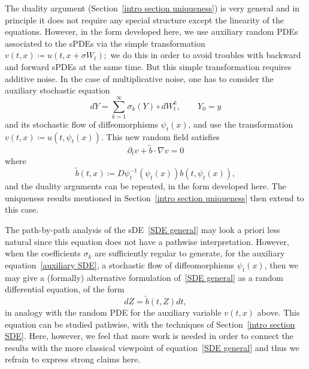 \documentclass[a4paper,10pt]{article}
\newcommand\1{\mathbbm{1}}
\newcommand{\td}{\tilde}
\numberwithin{equation}{section}
\begin{document}
The duality argument (Section~\ref{intro section uniqueness}) is very general and in principle it does not require any special structure except the linearity of the equations. However, in the form developed here, we use auxiliary random PDEs associated to the sPDEs via the simple transformation $v( t,x) \coloneqq u( t,x+\sigma W_{t}) $;\ we do this in order to avoid troubles with backward and forward sPDEs at the same time. But this simple transformation requires additive noise. In the case of multiplicative noise, one has to consider the auxiliary stochastic equation 
\begin{equation}
dY = \sum_{k=1}^{\infty }\sigma _{k}( Y) \circ dW_{t}^{k},\qquad Y_{0}=y  \label{auxiliary SDE}
\end{equation} 
and its stochastic flow of diffeomorphisms $\psi_{t}( x) $, and use the transformation $v(t,x) \coloneqq u(t,\psi_{t}(x))$. This new random field satisfies 
\begin{equation*}
\partial_t v +\widetilde{b}\cdot \nabla v=0
\end{equation*} 
where
\begin{equation*}
\td{b}(t,x)\coloneqq D\psi^{-1}_t(\psi_t(x))b(t,\psi_t(x)),
\end{equation*}
and the duality arguments can be repeated, in the form developed here. The uniqueness results mentioned in Section~\ref{intro section uniqueness} then extend to this case.

The path-by-path analysis of the sDE~\eqref{SDE general} may look a priori less natural since this equation does not have a pathwise interpretation. However, when the coefficients $\sigma _{k}$ are sufficiently regular to generate, for the auxiliary equation~\eqref{auxiliary SDE}, a stochastic flow of diffeomorphisms $\psi _{t}( x) $, then we may give a (formally) alternative formulation of~\eqref{SDE general} as a random differential equation, of the form 
\begin{equation*}
dZ = \td{b}(t,Z) dt,
\end{equation*}
in analogy with the random PDE for the auxiliary variable $v(t,x) $ above. This equation can be studied pathwise, with the techniques of Section~\ref{intro section SDE}. Here, however, we feel that more work is needed in order to connect the results with the more classical viewpoint of equation~\eqref{SDE general} and thus we refrain to express strong claims here.
\end{document}
